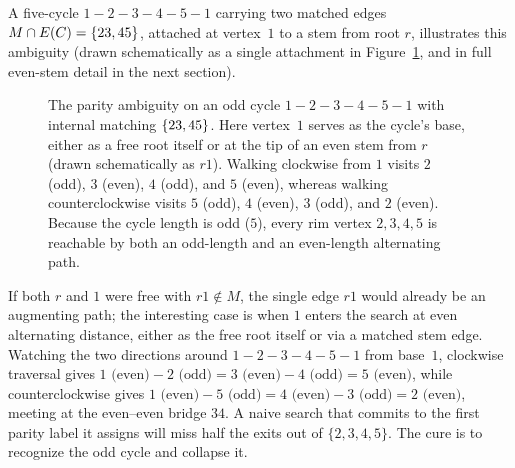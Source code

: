 A five-cycle $1\!-\!2\!-\!3\!-\!4\!-\!5\!-\!1$ carrying two matched edges $M\cap E(C)=\{23,45\}$, attached at vertex~$1$ to a stem from root $r$, illustrates this ambiguity (drawn schematically as a single attachment in Figure~\ref{ch17:fig-parity-trap}, and in full even-stem detail in the next section).

\begin{figure}[H]
\centering
{}
\caption{The parity ambiguity on an odd cycle $1\!-\!2\!-\!3\!-\!4\!-\!5\!-\!1$ with internal matching $\{23,45\}$. Here vertex~$1$ serves as the cycle's base, either as a free root itself or at the tip of an even stem from $r$ (drawn schematically as $r1$). Walking clockwise from $1$ visits $2$ (odd), $3$ (even), $4$ (odd), and $5$ (even), whereas walking counterclockwise visits $5$ (odd), $4$ (even), $3$ (odd), and $2$ (even). Because the cycle length is odd ($5$), every rim vertex $2,3,4,5$ is reachable by both an odd-length and an even-length alternating path.}
\label{ch17:fig-parity-trap}
\end{figure}

If both $r$ and $1$ were free with $r1\notin M$, the single edge $r1$ would already be an augmenting
path; the interesting case is when $1$ enters the search at even alternating distance, either as the
free root itself or via a matched stem edge. Watching the two directions around
$1\!-\!2\!-\!3\!-\!4\!-\!5\!-\!1$ from base~$1$, clockwise traversal gives
$1\text{ (even)}\!-\!2\text{ (odd)}\!=\!3\text{ (even)}\!-\!4\text{ (odd)}\!=\!5\text{ (even)}$,
while counterclockwise gives
$1\text{ (even)}\!-\!5\text{ (odd)}\!=\!4\text{ (even)}\!-\!3\text{ (odd)}\!=\!2\text{ (even)}$,
meeting at the even--even bridge $34$. A naive search that commits to the first parity label it assigns
will miss half the exits out of $\{2,3,4,5\}$. The cure is to recognize the odd cycle and collapse it.


